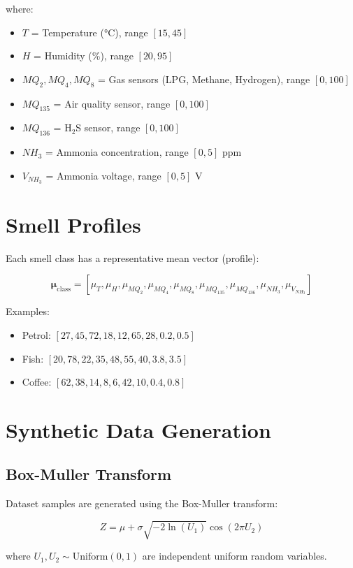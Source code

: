 \documentclass[10pt]{article}
\begin{document}
where:
\begin{itemize}
    \item $T$ = Temperature (°C), range $[15, 45]$
    \item $H$ = Humidity (\%), range $[20, 95]$
    \item $MQ_2, MQ_4, MQ_8$ = Gas sensors (LPG, Methane, Hydrogen), range $[0, 100]$
    \item $MQ_{135}$ = Air quality sensor, range $[0, 100]$
    \item $MQ_{136}$ = H$_2$S sensor, range $[0, 100]$
    \item $NH_3$ = Ammonia concentration, range $[0, 5]$ ppm
    \item $V_{NH_3}$ = Ammonia voltage, range $[0, 5]$ V
\end{itemize}

\section{Smell Profiles}

Each smell class has a representative mean vector (profile):

\[
\boldsymbol{\mu}_{\text{class}} = [\mu_T, \mu_H, \mu_{MQ_2}, \mu_{MQ_4}, \mu_{MQ_8}, \mu_{MQ_{135}}, \mu_{MQ_{136}}, \mu_{NH_3}, \mu_{V_{NH_3}}]
\]

Examples:
\begin{itemize}
    \item Petrol: $[27, 45, 72, 18, 12, 65, 28, 0.2, 0.5]$
    \item Fish: $[20, 78, 22, 35, 48, 55, 40, 3.8, 3.5]$
    \item Coffee: $[62, 38, 14, 8, 6, 42, 10, 0.4, 0.8]$
\end{itemize}

\section{Synthetic Data Generation}

\subsection{Box-Muller Transform}

Dataset samples are generated using the Box-Muller transform:

\[
Z = \mu + \sigma \sqrt{-2 \ln(U_1)} \cos(2\pi U_2)
\]

where $U_1, U_2 \sim \text{Uniform}(0,1)$ are independent uniform random variables.
\end{document}
